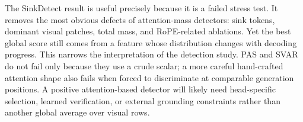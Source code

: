 The SinkDetect result is useful precisely because it is a failed stress test. It removes the most obvious defects of attention-mass detectors: sink tokens, dominant visual patches, total mass, and RoPE-related ablations. Yet the best global score still comes from a feature whose distribution changes with decoding progress. This narrows the interpretation of the detection study. PAS and SVAR do not fail only because they use a crude scalar; a more careful hand-crafted attention shape also fails when forced to discriminate at comparable generation positions. A positive attention-based detector will likely need head-specific selection, learned verification, or external grounding constraints rather than another global average over visual rows.
